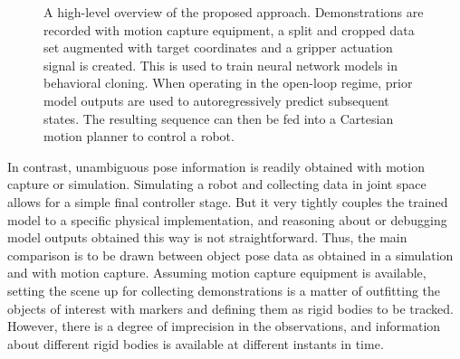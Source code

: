 \documentclass{article}
\begin{document}
\begin{figure}
	\centering
	\caption{A high-level overview of the proposed approach. Demonstrations are recorded with motion capture equipment, a split and cropped data set augmented with target coordinates and a gripper actuation signal is created. This is used to train neural network models in behavioral cloning. When operating in the open-loop regime, prior model outputs are used to autoregressively predict subsequent states. The resulting sequence can then be fed into a Cartesian motion planner to control a robot.}
	\label{fig:approach}
\end{figure}

In contrast, unambiguous pose information is readily obtained with motion capture or simulation. Simulating a robot and collecting data in joint space allows for a simple final controller stage. But it very tightly couples the trained model to a specific physical implementation, and reasoning about or debugging model outputs obtained this way is not straightforward. Thus, the main comparison is to be drawn between object pose data as obtained in a simulation and with motion capture. Assuming motion capture equipment is available, setting the scene up for collecting demonstrations is a matter of outfitting the objects of interest with markers and defining them as rigid bodies to be tracked. However, there is a degree of imprecision in the observations, and information about different rigid bodies is available at different instants in time. 
\end{document}
